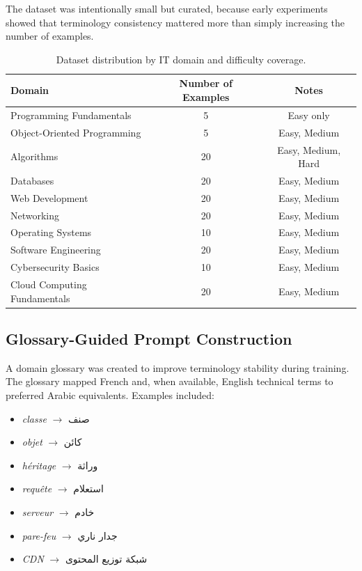 \documentclass[education,article,submit,moreauthors]{Definitions/mdpi}
\begin{document}
The dataset was intentionally small but curated, because early experiments showed that terminology consistency mattered more than simply increasing the number of examples.

\begin{table}[H]
\caption{Dataset distribution by IT domain and difficulty coverage.}
\label{tab:dataset_distribution}
\centering
\begin{tabular}{lcc}
\toprule
Domain & Number of Examples & Notes \\
\midrule
Programming Fundamentals & 5  & Easy only \\
Object-Oriented Programming & 5  & Easy, Medium \\
Algorithms & 20 & Easy, Medium, Hard \\
Databases & 20 & Easy, Medium \\
Web Development & 20 & Easy, Medium \\
Networking & 20 & Easy, Medium \\
Operating Systems & 10 & Easy, Medium \\
Software Engineering & 20 & Easy, Medium \\
Cybersecurity Basics & 10 & Easy, Medium \\
Cloud Computing Fundamentals & 20 & Easy, Medium \\
\bottomrule
\end{tabular}
\end{table}

\subsection{Glossary-Guided Prompt Construction}

A domain glossary was created to improve terminology stability during training. The glossary mapped French and, when available, English technical terms to preferred Arabic equivalents. Examples included:

\begin{itemize}[leftmargin=1.5em]
    \item \textit{classe} $\rightarrow$ \textarabic{صنف}
    \item \textit{objet} $\rightarrow$ \textarabic{كائن}
    \item \textit{héritage} $\rightarrow$ \textarabic{وراثة}
    \item \textit{requête} $\rightarrow$ \textarabic{استعلام}
    \item \textit{serveur} $\rightarrow$ \textarabic{خادم}
    \item \textit{pare-feu} $\rightarrow$ \textarabic{جدار ناري}
    \item \textit{CDN} $\rightarrow$ \textarabic{شبكة توزيع المحتوى}
\end{itemize}
\end{document}
